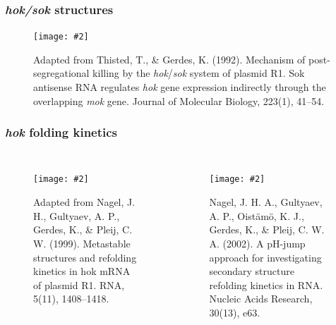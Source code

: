 \documentclass{beamer}
\newcommand{\slidefigure}[2][1]{\texttt{[image: \#2]}}
\begin{document}
\begin{frame}
	\frametitle{{\em hok/sok} structures}
	\begin{figure}
		\centering \slidefigure{hoksoksequence} \caption{Adapted from Thisted, T., \& Gerdes, K. (1992). Mechanism of post-segregational killing by the {\em hok}/{\em sok} system of plasmid R1. Sok antisense RNA regulates {\em hok} gene expression indirectly through the overlapping {\em mok} gene. Journal of Molecular Biology, 223(1), 41--54.}
	\end{figure}
\end{frame}

\begin{frame}
	\frametitle{{\em hok} folding kinetics}
	\begin{columns}
		\begin{figure}
			\centering \slidefigure[.7]{hoktranscription} \caption{\tiny Adapted from Nagel, J. H., Gultyaev, A. P., Gerdes, K., \& Pleij, C. W. (1999). Metastable structures and refolding kinetics in hok mRNA of plasmid R1. RNA, 5(11), 1408--1418.}
		\end{figure}

		\begin{figure}
			\centering \slidefigure{hokrefoldingkinetics} \caption{\tiny Nagel, J. H. A., Gultyaev, A. P., Oist{\"a}m{\"o}, K. J., Gerdes, K., \& Pleij, C. W. A. (2002). A pH-jump approach for investigating secondary structure refolding kinetics in RNA. Nucleic Acids Research, 30(13), e63.}
		\end{figure}
	\end{columns}
\end{frame}
\end{document}
